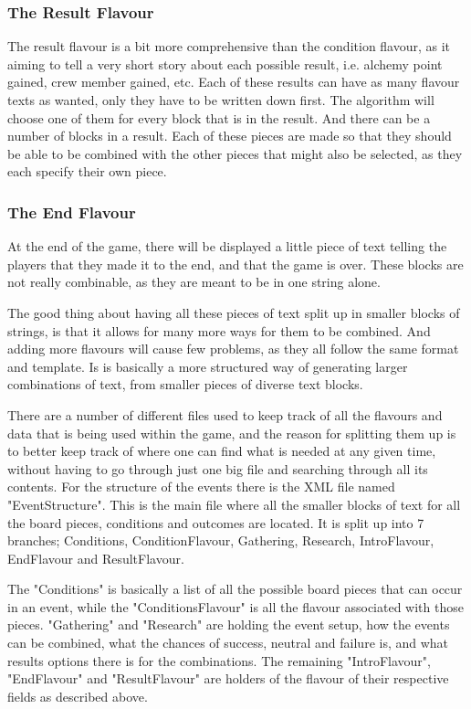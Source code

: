 \subsubsection{The Result Flavour}
The result flavour is a bit more comprehensive than the  condition flavour, as it aiming to tell a very short story about each possible result, i.e. alchemy point gained, crew member gained, etc.
Each of these results can have as many flavour texts as wanted, only they have to be written down first. The algorithm will choose one of them for every block that is in the result. And there can be a number of blocks in a result. Each of these pieces are made so that they should be able to be combined with the other pieces that might also be selected, as they each specify their own piece.
\subsubsection{The End Flavour}
At the end of the game, there will be displayed a little piece of text telling the players that they made it to the end, and that the game is over. These blocks are not really combinable, as they are meant to be in one string alone.

The good thing about having all these pieces of text split up in smaller blocks of strings, is that it allows for many more ways for them to be combined. And adding more flavours will cause few problems, as they all follow the same format and template. Is is basically a more structured way of generating larger combinations of text, from smaller pieces of diverse text blocks.

There are a number of different files used to keep track of all the flavours and data that is being used within the game, and the reason for splitting them up is to better keep track of where one can find what is needed at any given time, without having to go through just one big file and searching through all its contents.
For the structure of the events there is the XML file named "EventStructure". This is the main file where all the smaller blocks of text for all the board pieces, conditions and outcomes are located. It is split up into 7 branches; Conditions, ConditionFlavour, Gathering, Research, IntroFlavour, EndFlavour and ResultFlavour.

The "Conditions" is basically a list of all the possible board pieces that can occur in an event, while the "ConditionsFlavour" is all the flavour associated with those pieces.
"Gathering" and "Research" are holding the event setup, how the events can be combined, what the chances of success, neutral and failure is, and what results options there is for the combinations.
The remaining "IntroFlavour", "EndFlavour" and "ResultFlavour" are holders of the flavour of their respective fields as described above.

